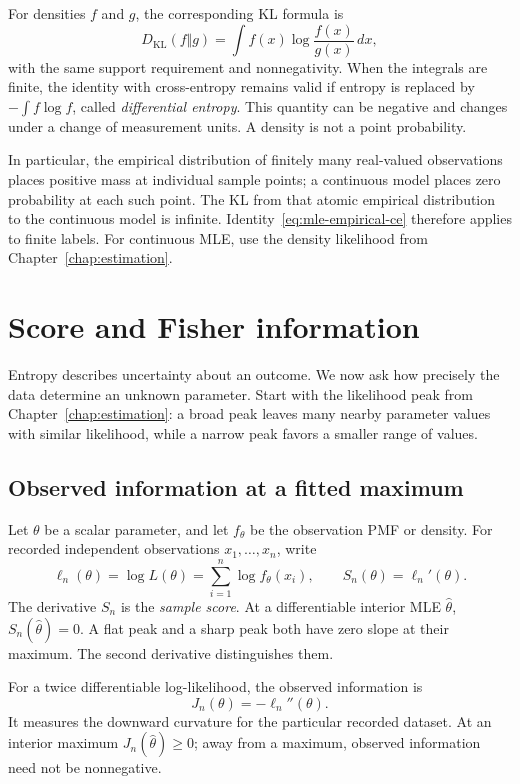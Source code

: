 For densities \(f\) and \(g\), the corresponding KL formula is
\[
  D_{\mathrm{KL}}(f\Vert g)
  =\int f(x)\log\frac{f(x)}{g(x)}\,dx,
\]
with the same support requirement and nonnegativity.
When the integrals are finite, the identity with cross-entropy remains
valid if entropy is replaced by \(-\int f\log f\), called
\emph{differential entropy}. This quantity can be negative and changes
under a change of measurement units. A density is not a point probability.

In particular, the empirical distribution of finitely many real-valued
observations places positive mass at individual sample points; a
continuous model places zero probability at each such point.
The KL from that atomic empirical distribution to the continuous model
is infinite. Identity~\eqref{eq:mle-empirical-ce} therefore applies to
finite labels. For continuous MLE, use the density likelihood from
Chapter~\ref{chap:estimation}.

\section{Score and Fisher information}
\label{sec:fisher-information}

Entropy describes uncertainty about an outcome. We now ask how precisely
the data determine an unknown parameter. Start with the likelihood peak
from Chapter~\ref{chap:estimation}: a broad peak leaves many nearby
parameter values with similar likelihood, while a narrow peak favors
a smaller range of values.

\subsection{Observed information at a fitted maximum}
\label{sec:observed-information}

Let \(\theta\) be a scalar parameter, and let \(f_\theta\) be the
observation PMF or density. For recorded independent observations
\(x_1,\ldots,x_n\), write
\[
  \ell_n(\theta)=\log L(\theta)
     =\sum_{i=1}^n\log f_\theta(x_i),\qquad
  S_n(\theta)=\ell_n'(\theta).
\]
The derivative \(S_n\) is the \emph{sample score}.
At a differentiable interior MLE \(\widehat\theta\),
\(S_n(\widehat\theta)=0\). A flat peak and a sharp peak both have zero
slope at their maximum. The second derivative distinguishes them.

\begin{definition}
For a twice differentiable log-likelihood, the observed information is
\begin{equation}
  J_n(\theta)=-\ell_n''(\theta).
  \label{eq:observed-information}
\end{equation}
It measures the downward curvature for the particular recorded dataset.
At an interior maximum \(J_n(\widehat\theta)\ge0\); away from a maximum,
observed information need not be nonnegative.
\end{definition}

